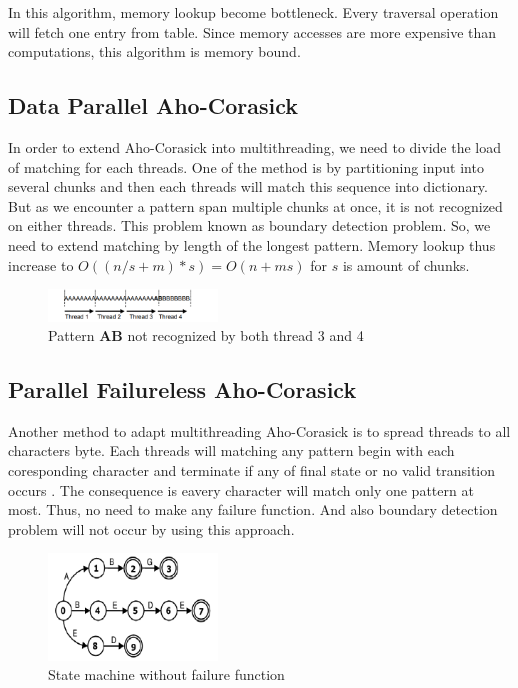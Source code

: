 \documentclass[conference]{IEEEtran}
\begin{document}
    In this algorithm, memory lookup become bottleneck. Every traversal operation will fetch one entry from table. Since memory accesses are more expensive than computations, this algorithm is memory bound.

    \subsection{Data Parallel Aho-Corasick}
    In order to extend Aho-Corasick into multithreading, we need to divide the load of matching for each threads. One of the method is by partitioning input into several chunks and then each threads will match this sequence into dictionary. But as we encounter a pattern span multiple chunks at once, it is not recognized on either threads. This problem known as boundary detection problem. So, we need to extend matching by length of the longest pattern. Memory lookup thus increase to $O((n/s + m) * s) = O(n + ms)$ for $s$ is amount of chunks. 

    \begin{figure}[htbp]
        \centerline{\includegraphics[width=0.4\textwidth]{../src/resources/boundary.png}}
        \caption{Pattern \textbf{AB} not recognized by both thread 3 and 4}
        \label{fig}
    \end{figure}

    \subsection{Parallel Failureless Aho-Corasick}
    Another method to adapt multithreading Aho-Corasick is to spread threads to all characters byte. Each threads will matching any pattern begin with each coresponding character and terminate if any of final state or no valid transition occurs \cite{lin2013}. The consequence is eavery character will match only one pattern at most.
    Thus, no need to make any failure function. And also boundary detection problem will not occur by using this approach.

    \begin{figure}[htbp]
        \centerline{\includegraphics[width=0.4\textwidth]{../src/resources/pfac.png}}
        \caption{State machine without failure function}
        \label{fig}
    \end{figure} 
\end{document}
